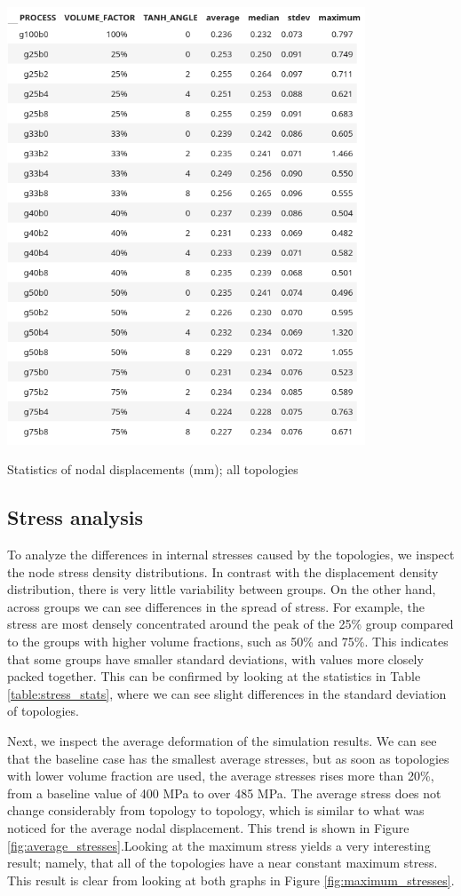 \documentclass[../main.tex]{subfiles}
\begin{document}
\begin{table}[h!]
  \centering 
  \includegraphics[width=0.8\textwidth]{images/results/plots/femoral/displacement/statistics.png}
  \caption{Statistics of nodal displacements (mm); all topologies}
  \label{table:disp_stats}
\end{table}

\clearpage
\subsection{Stress analysis}

To analyze the differences in internal stresses caused by the topologies, we inspect the node stress density distributions. In contrast with the displacement density distribution, there is very little variability between groups. On the other hand, across groups we can see differences in the spread of stress. For example, the stress are most densely concentrated around the peak of the 25\% group compared to the groups with higher volume fractions, such as 50\% and 75\%. This indicates that some groups have smaller standard deviations, with values more closely packed together. This can be confirmed by looking at the statistics in  
Table \ref{table:stress_stats}, where we can see slight differences in the standard deviation of topologies.

Next, we inspect the average deformation of the simulation results. We can see that the baseline case has the smallest average stresses, but as soon as topologies with lower volume fraction are used, the average stresses rises more than 20\%, from a baseline value of 400 MPa to over 485 MPa. The average stress does not change considerably from topology to topology, which is similar to what was noticed for the average nodal displacement. This trend is shown in Figure \ref{fig:average_stresses}.Looking at the maximum stress yields a very interesting result; namely, that all of the topologies have a near constant maximum stress. This result is clear from looking at both graphs in Figure \ref{fig:maximum_stresses}.
\end{document}
